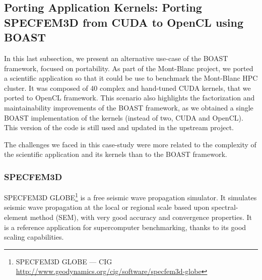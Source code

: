 \documentclass{IEEEtran}
\begin{document}
% 
% 
% 
% 
 

\subsection{Porting Application Kernels: Porting SPECFEM3D from CUDA to
OpenCL using BOAST\label{subsec:specfem}}

In this last subsection, we present an alternative use-case of the BOAST
framework, focused on portability. As part of the Mont-Blanc project,
we ported a scientific application so that it could be use to
benchmark the Mont-Blanc HPC cluster. It was composed of 40 complex
and hand-tuned CUDA kernels, that we ported to OpenCL framework. This
scenario also highlights the factorization and maintainability
improvements of the BOAST framework, as we obtained a single BOAST
implementation of the kernels (instead of two, CUDA and OpenCL). This
version of the code is still used and updated in the upstream project.

The challenges we faced in this case-study were more related to the
complexity of the scientific application and its kernels than to the
BOAST framework.
\subsubsection{SPECFEM3D}

SPECFEM3D GLOBE\footnote{SPECFEM3D GLOBE --- CIG
  \url{http://www.geodynamics.org/cig/software/specfem3d-globe}} is a
free seismic wave propagation simulator. It simulates seismic wave
propagation at the local or regional scale based upon spectral-element
method (SEM), with very good accuracy and convergence properties. It
is a reference application for supercomputer benchmarking, thanks to
its good scaling capabilities.
\end{document}
